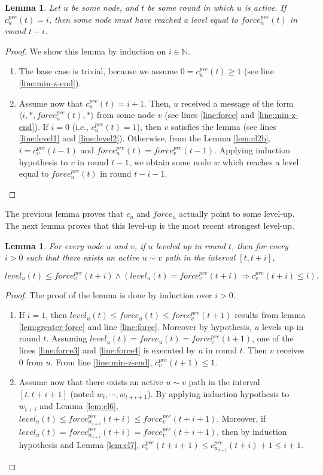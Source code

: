 \documentclass[11pt,letterpaper]{article}
\newtheorem{lem}[thm]{Lemma}
\begin{document}
\begin{lem} \label{lem:safety-force}
	Let $u$ be some node, and $t$ be some round in which $u$ is active.
	If $c_u^{pre}(t) = i$, then some node must have reached a level equal to $force_u^{pre}(t)$ in round $t-i$.
\end{lem}
\begin{proof}
	We show this lemma by induction on $i \in \mathds{N}$.
	\begin{enumerate}
		\item The base case is trivial, because we assume $0 = c_u^{pre}(t) \geq 1$ (see line \ref{line:min-z-end}).
		\item Assume now that $c_u^{pre}(t) = i+1$.
			Then, $u$ received a message of the form $\langle i, *, force_u^{pre}(t), * \rangle$ from some node $v$ (see lines \ref{line:force} and \ref{line:min-z-end}).
			If $i = 0$ (i.e., $c_u^{pre}(t) = 1$), then $v$ satisfies the lemma (see lines \ref{line:level1} and \ref{line:level2}).
			Otherwise, from the Lemma \ref{lem:cl2b}, $i = c_v^{pre}(t-1)$ and $force_u^{pre}(t) = force_v^{pre}(t-1)$.
			Applying induction hypothesis to $v$ in round $t-1$, we obtain some node $w$ which reaches a level equal to $force_u^{pre}(t)$ in round $t-i-1$.
	\end{enumerate}
\end{proof}

The previous lemma proves that $c_u$ and $force_u$ actually point to some level-up.
The next lemma proves that this level-up is the most recent strongest level-up.
\begin{lem} \label{lem:strongest}
	For every node $u$ and $v$, if $u$ leveled up in round $t$,
	then for every $i > 0$ such that there exists an active $u \sim v$ path in the interval $[t,t+i]$,

	$$level_u(t) \leq force_v^{pre}(t+i) \wedge (level_u(t) = force_v^{pre}(t+i) \Rightarrow c^{pre}_v(t+i) \leq i).$$

\end{lem}
\begin{proof}
	\noindent The proof of the lemma is done by induction over $i > 0$.
	\begin{enumerate}
		\item If $i = 1$, then $level_u(t) \leq force_u(t) \leq force_v^{pre}(t+1)$ results from lemma \ref{lem:greater-force} and line \ref{line:force}.
			Moreover by hypothesis, $u$ levels up in round $t$.
			Assuming $level_u(t) = force_u(t) = force_v^{pre}(t+1)$, one of the lines \ref{line:force3} and \ref{line:force4} is executed by $u$ in round $t$.
			Then $v$ receives 0 from $u$. From line \ref{line:min-z-end}, $c^{pre}_v(t+1) \leq 1$.
		\item Assume now that there exists an active $u \sim v$ path in the interval $[t,t+i+1]$ (noted $w_t, \cdots, w_{t+i+1}$).
			By applying induction hypothesis to $w_{t+i}$ and Lemma \ref{lem:cl6}, $level_u(t) \leq force_{w_{t+i}}^{pre}(t+i) \leq force_v^{pre}(t+i+1)$.
			Moreover, if $level_u(t) = force_{w_{t+i}}^{pre}(t+i) = force_v^{pre}(t+i+1)$,
			then by induction hypothesis and Lemma \ref{lem:cl7}, $c^{pre}_v(t+i+1) \leq c_{w_{t+i}}^{pre}(t+i) + 1 \leq i + 1$.
	\end{enumerate}
\end{proof}
\end{document}
